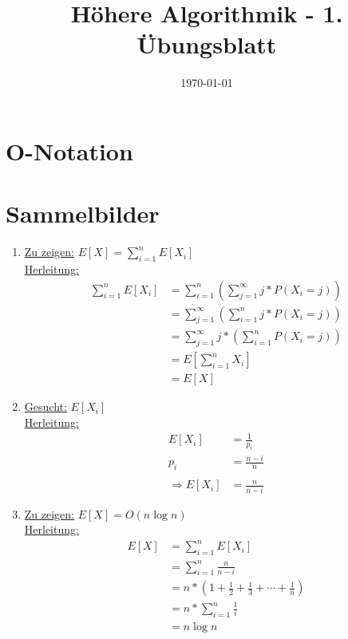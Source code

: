 \documentclass[a4paper,10pt]{scrartcl}
\title{H\"ohere Algorithmik - 1. \"Ubungsblatt}
\author{\Authors}
\date{\today}
\begin{document}
\maketitle

\section{$\boldsymbol{O}$-Notation}
\section{Sammelbilder}
\begin{enumerate}
\item 
	\underline{Zu zeigen:} $E[X] = \sum\limits_{i = 1}^{n} E[X_{i}]$\\
	\underline{Herleitung:} \begin{align*}
		\sum\limits_{i = 1}^{n} E\left[X_{i}\right] &= \sum\limits_{i = 1}^{n}\left(\sum\limits_{j = 1}^{\infty}j * P\left(X_{i} = j\right)\right)\\
		&=\sum\limits_{j = 1}^{\infty}\left(\sum\limits_{i = 1}^{n}j * P\left(X_{i} = j\right)\right)\\
		&=\sum\limits_{j = 1}^{\infty}j * \left(\sum\limits_{i = 1}^{n}P\left(X_{i} = j\right)\right)\\
		&= E\left[\sum\limits_{i = 1}^{n}X_{i}\right]\\
		&= E\left[X\right]
	\end{align*}
	
\item 
	\underline{Gesucht:} $E[X_{i}]$\\
	\underline{Herleitung:} \begin{align*}
		E\left[X_{i}\right] &= \frac{1}{p_{i}}\\
		p_{i} &= \frac{n-i}{n}\\
		\\
		\Rightarrow E\left[X_{i}\right] &= \frac{n}{n-i}	
	\end{align*}
\item 
	\underline{Zu zeigen:} $E[X] = O(n \log n)$\\
	\underline{Herleitung:} \begin{align*}
		E\left[X\right] &= \sum\limits_{i = 1}^{n}E\left[X_{i}\right]\\
		&= \sum\limits_{i = 1}^{n}\frac{n}{n - i}\\
		&= n * \left(1 + \frac{1}{2} + \frac{1}{3} + \cdots + \frac{1}{n}\right)\\
		&= n * \sum\limits_{i = 1}^{n}\frac{1}{i}\\
		&= n \log n
	\end{align*}
\end{enumerate}
\end{document}
